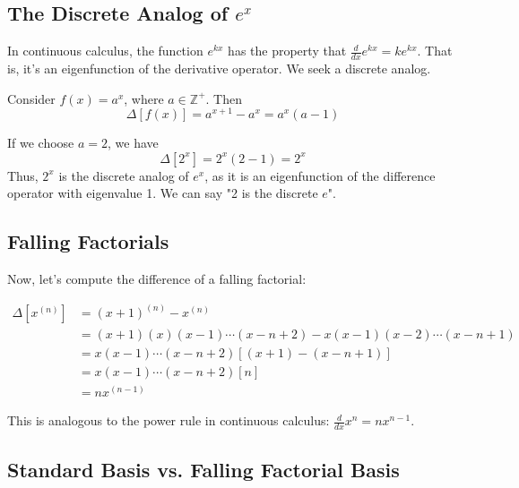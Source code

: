\documentclass{report}
\begin{document}
\subsection*{The Discrete Analog of $e^x$}

In continuous calculus, the function $e^{kx}$ has the property that $\frac{d}{dx}e^{kx} = ke^{kx}$.  That is, it's an eigenfunction of the derivative operator. We seek a discrete analog.

Consider $f(x) = a^x$, where $a \in \mathbb{Z}^+$. Then
\[
	\Delta[f(x)] = a^{x+1} - a^x = a^x(a - 1)
\]

If we choose $a=2$, we have
\[
	\Delta[2^x] = 2^x(2-1) = 2^x
\]
Thus, $2^x$ is the discrete analog of $e^x$, as it is an eigenfunction of the difference operator with eigenvalue 1. We can say "2 is the discrete $e$".

\subsection*{Falling Factorials}



Now, let's compute the difference of a falling factorial:

\begin{align*}
	\Delta[x^{(n)}] & = (x+1)^{(n)} - x^{(n)}                                 \\
	                & = (x+1)(x)(x-1)\cdots(x-n+2) - x(x-1)(x-2)\cdots(x-n+1) \\
	                & = x(x-1)\cdots(x-n+2)[(x+1) - (x-n+1)]                  \\
	                & = x(x-1)\cdots(x-n+2)[n]                                \\
	                & = n x^{(n-1)}
\end{align*}

This is analogous to the power rule in continuous calculus: $\frac{d}{dx}x^n = nx^{n-1}$.

\subsection*{Standard Basis vs. Falling Factorial Basis}
\end{document}
